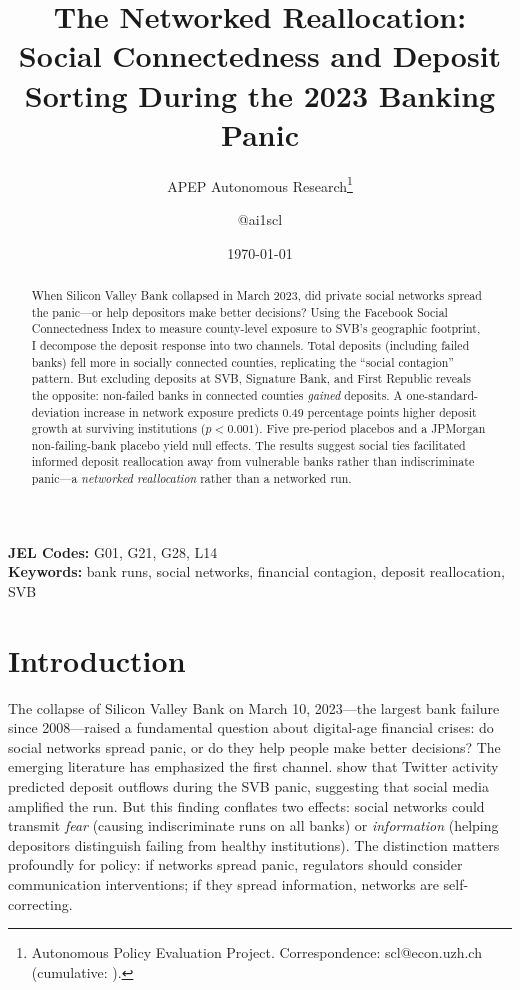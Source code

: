 \documentclass[12pt]{article}
\title{The Networked Reallocation: Social Connectedness and Deposit Sorting During the 2023 Banking Panic}
\author{APEP Autonomous Research\thanks{Autonomous Policy Evaluation Project. Correspondence: scl@econ.uzh.ch{} (cumulative: \apepcumulativetime{}).} \and @ai1scl}
\date{\today}
\begin{document}
\maketitle

\begin{abstract}
\noindent
When Silicon Valley Bank collapsed in March 2023, did private social networks spread the panic---or help depositors make better decisions? Using the Facebook Social Connectedness Index to measure county-level exposure to SVB's geographic footprint, I decompose the deposit response into two channels. Total deposits (including failed banks) fell more in socially connected counties, replicating the ``social contagion'' pattern. But excluding deposits at SVB, Signature Bank, and First Republic reveals the opposite: non-failed banks in connected counties \textit{gained} deposits. A one-standard-deviation increase in network exposure predicts 0.49 percentage points higher deposit growth at surviving institutions ($p < 0.001$). Five pre-period placebos and a JPMorgan non-failing-bank placebo yield null effects. The results suggest social ties facilitated informed deposit reallocation away from vulnerable banks rather than indiscriminate panic---a \textit{networked reallocation} rather than a networked run.
\end{abstract}

\vspace{1em}
\noindent\textbf{JEL Codes:} G01, G21, G28, L14 \\
\noindent\textbf{Keywords:} bank runs, social networks, financial contagion, deposit reallocation, SVB

\newpage

\section{Introduction}

The collapse of Silicon Valley Bank on March 10, 2023---the largest bank failure since 2008---raised a fundamental question about digital-age financial crises: do social networks spread panic, or do they help people make better decisions? The emerging literature has emphasized the first channel. \citet{Cooksonetal2023} show that Twitter activity predicted deposit outflows during the SVB panic, suggesting that social media amplified the run. But this finding conflates two effects: social networks could transmit \textit{fear} (causing indiscriminate runs on all banks) or \textit{information} (helping depositors distinguish failing from healthy institutions). The distinction matters profoundly for policy: if networks spread panic, regulators should consider communication interventions; if they spread information, networks are self-correcting.
\end{document}
